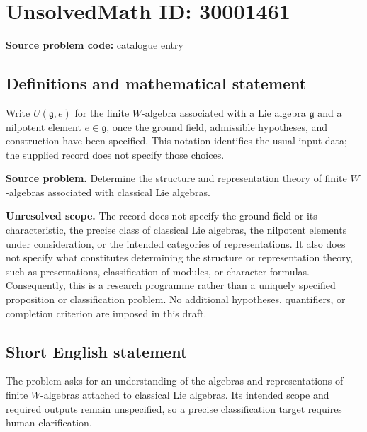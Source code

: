 \documentclass[11pt]{article}
\begin{document}
\section*{UnsolvedMath ID: 30001461}
\textbf{Source problem code:} catalogue entry
\subsection{Definitions and mathematical statement}
Write \(U(\mathfrak g,e)\) for the finite \(W\)-algebra associated with a Lie algebra \(\mathfrak g\) and a nilpotent element \(e\in\mathfrak g\), once the ground field, admissible hypotheses, and construction have been specified. This notation identifies the usual input data; the supplied record does not specify those choices.

\textbf{Source problem.} Determine the structure and representation theory of finite \(W\)-algebras associated with classical Lie algebras.

\textbf{Unresolved scope.} The record does not specify the ground field or its characteristic, the precise class of classical Lie algebras, the nilpotent elements under consideration, or the intended categories of representations. It also does not specify what constitutes determining the structure or representation theory, such as presentations, classification of modules, or character formulas. Consequently, this is a research programme rather than a uniquely specified proposition or classification problem. No additional hypotheses, quantifiers, or completion criterion are imposed in this draft.
\subsection{Short English statement}
The problem asks for an understanding of the algebras and representations of finite \(W\)-algebras attached to classical Lie algebras. Its intended scope and required outputs remain unspecified, so a precise classification target requires human clarification.
\end{document}
